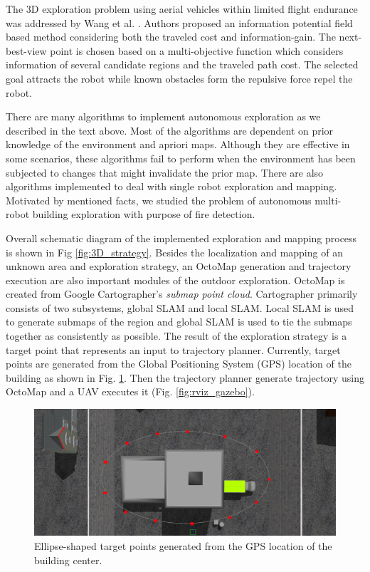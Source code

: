 The 3D exploration problem using aerial vehicles within limited flight endurance was addressed by Wang et al. \cite{Wang2019}. Authors proposed an information potential field based method considering both the traveled cost and information-gain. The next-best-view point is chosen based on a multi-objective function which considers information of several candidate regions and the traveled path cost. The selected goal
attracts the robot while known obstacles form the repulsive
force repel the robot.

There are many algorithms to implement autonomous exploration as we described in the text above. Most of the algorithms are dependent on prior knowledge of the environment and apriori maps. Although they are effective in some scenarios, these algorithms fail to perform when the environment has been subjected to changes that might invalidate the prior map. There are also algorithms implemented to deal with single robot exploration and mapping. Motivated by mentioned facts, we studied the problem of autonomous multi-robot building exploration with purpose of fire detection.

Overall schematic diagram of the implemented exploration and mapping process is shown in Fig \ref{fig:3D_strategy}. Besides the localization and mapping of an unknown area and exploration strategy, an OctoMap generation and trajectory execution are also important modules of the outdoor exploration. OctoMap is created from Google Cartographer's \textit{submap point cloud}. Cartographer primarily consists of two subsystems, global SLAM and local SLAM. Local SLAM is used to generate submaps of the region and global SLAM is used to tie the submaps together as consistently as possible. The result of the exploration strategy is a target point that represents an input to trajectory planner. Currently, target points are generated from the Global Positioning System (GPS) location of the building as shown in Fig. \ref{fig:building}. Then the trajectory planner generate trajectory using OctoMap and a UAV executes it (Fig. \ref{fig:rviz_gazebo}).

\begin{figure}[t!]
	\centering
	\includegraphics[width=1.0\columnwidth]{./pictures/building.png}	
	\caption{Ellipse-shaped target points generated from the GPS location of the building center.}
	\label{fig:building}
\end{figure}

